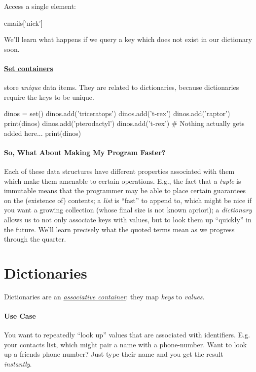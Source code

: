\documentclass[12pt,letterpaper,twoside]{article}
\begin{document}
Access a single element:
\begin{python}
emails['nick']
\end{python}
We'll learn what happens if we query a key which does not exist in our dictionary soon.

\paragraph{\href{https://en.wikipedia.org/wiki/Set_(abstract_data_type)}{Set containers}} 
store \emph{unique} data items. They are related to
dictionaries, because dictionaries require the keys to be unique.

\begin{python}
dinos = set()
dinos.add('triceratops')
dinos.add('t-rex')
dinos.add('raptor')
print(dinos)
dinos.add('pterodactyl')
dinos.add('t-rex')         # Nothing actually gets added here...
print(dinos)
\end{python}

\paragraph{So, What About Making My Program Faster?} Each of these data structures
have different properties associated with them which make them amenable to certain
operations. E.g., the fact that a \emph{tuple} is immutable means that the programmer
may be able to place certain guarantees on the (existence of) contents; a \emph{list} is
``fast'' to append to, which might be nice if you want a growing collection (whose final size is not known apriori); 
a \emph{dictionary} allows us to not only associate keys with values, but to look them up ``quickly'' in the future.
We'll learn precisely what the quoted terms mean as we progress through the quarter.

\section{Dictionaries}
Dictionaries are an \href{https://en.wikipedia.org/wiki/Collection_(abstract_data_type)#Associative_arrays}{\emph{associative container}}: 
they map \emph{keys} to \emph{values}. 

\vspace{-2ex}
\paragraph{Use Case} You want to repeatedly ``look up'' values that are associated with identifiers. E.g. your contacts list, which might pair
a name with a phone-number. Want to look up a friends phone number? Just type their name and you get the result \emph{instantly}.
\end{document}
